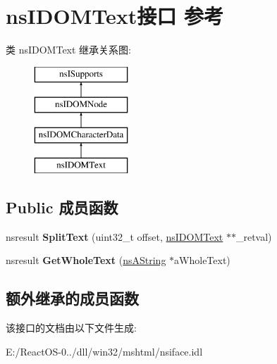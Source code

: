 \hypertarget{interfacens_i_d_o_m_text}{}\section{ns\+I\+D\+O\+M\+Text接口 参考}
\label{interfacens_i_d_o_m_text}
类 ns\+I\+D\+O\+M\+Text 继承关系图\+:\begin{figure}[H]
\begin{center}
\leavevmode
\includegraphics[height=4.000000cm]{interfacens_i_d_o_m_text}
\end{center}
\end{figure}
\subsection*{Public 成员函数}
\begin{DoxyCompactItemize}
\item 
\mbox{\label{interfacens_i_d_o_m_text_abba001d5cdfcf6c873eeb8738ca1d173}} 
nsresult {\bfseries Split\+Text} (uint32\+\_\+t offset, \hyperlink{interfacens_i_d_o_m_text}{ns\+I\+D\+O\+M\+Text} $\ast$$\ast$\+\_\+retval)
\item 
\mbox{\label{interfacens_i_d_o_m_text_a2092684fae7c9476c69d42731fc840e8}} 
nsresult {\bfseries Get\+Whole\+Text} (\hyperlink{structns_string_container}{ns\+A\+String} $\ast$a\+Whole\+Text)
\end{DoxyCompactItemize}
\subsection*{额外继承的成员函数}


该接口的文档由以下文件生成\+:\begin{DoxyCompactItemize}
\item 
E\+:/\+React\+O\+S-\/0../dll/win32/mshtml/nsiface.\+idl\end{DoxyCompactItemize}
